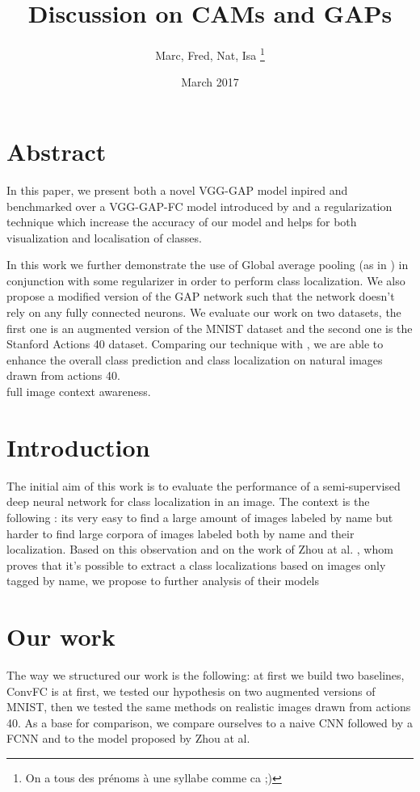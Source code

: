 \documentclass[12pt, letterpaper, twoside]{article}
\title{Discussion on CAMs and GAPs}
\author{Marc, Fred, Nat, Isa \thanks{On a tous des prénoms à une syllabe comme ca ;)}}
\date{March 2017}
\begin{document}
	\begin{titlepage}
	\maketitle
	\end{titlepage}

	\section{Abstract}
	\label{sec:abstract}
	In this paper, we present both a novel VGG-GAP model inpired and benchmarked over a VGG-GAP-FC model introduced by \cite{zhou2016learning} and a regularization technique which increase the accuracy of our model and helps for both visualization and localisation of classes.
	
	In this work we further demonstrate the use of Global average pooling (as in \cite{zhou2016learning}) in conjunction with some regularizer in order to perform class localization. We also propose a modified version of the GAP network such that the network doesn't rely on any fully connected neurons. We evaluate our work on two datasets, the first one is an augmented version of the MNIST dataset\cite{lecun1998gradient} and the second one is the Stanford Actions 40 dataset\cite{yao2011human}. Comparing our technique with \cite{zhou2016learning}, we are able to enhance the overall class prediction and class localization on natural images drawn from actions 40. \\
	full image context awareness.


	\section{Introduction}
	\label{sec:introduction}
	The initial aim of this work is to evaluate the performance of a semi-supervised deep neural network for class localization in an image.
	The context is the following : its very easy to find a large amount of images labeled by name but harder to find large corpora of images labeled both by name and their localization. Based on this observation and on the work of Zhou at al. \cite{zhou2016learning}, whom proves that it's possible to extract a class localizations based on images only tagged by name, we propose to  further analysis of their models 

	\section{Our work}
	\label{sec:related_work}
	The way we structured our work is the following: at first we build two baselines, ConvFC is
	at first, we tested our hypothesis on two augmented versions of MNIST, then we tested the same methods on realistic images drawn from actions 40. As a base for comparison, we compare ourselves to a naive CNN followed by a FCNN and to the model proposed by Zhou at al. 
\end{document}

